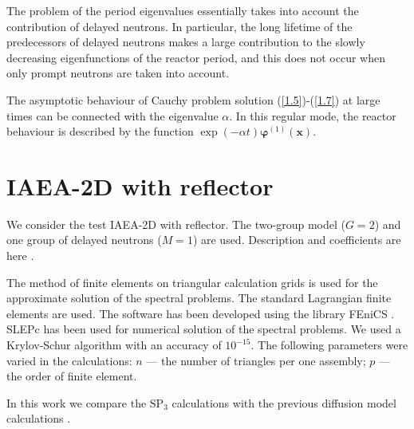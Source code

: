 \documentclass[a4paper]{jpconf}
\begin{document}
The problem of the period eigenvalues essentially takes into account the contribution of delayed neutrons.
In particular, the long lifetime of the predecessors of delayed neutrons makes a large contribution to the slowly decreasing eigenfunctions of the reactor period, and this does not occur when only prompt neutrons are taken into account.

The asymptotic behaviour of Cauchy problem solution (\ref{1.5})-(\ref{1.7}) at large times can be connected with the eigenvalue $\alpha$.
In this regular mode, the reactor behaviour is described by the function $\exp(-\alpha t) \bm \varphi^{(1)}(\bm x)$.

\section{IAEA-2D with reflector}
We consider the test IAEA-2D with reflector.
The two-group model ($G = 2$) and one group of delayed neutrons ($M = 1$) are used. 
Description and coefficients are here \cite{chao1995}.

The method of finite elements \cite{brenner2008} on triangular calculation grids is used for the approximate solution of the spectral problems. 
The standard Lagrangian finite elements are used.
The software has been developed using the library FEniCS \cite{logg2012}.
SLEPc has been used for numerical solution of the spectral problems.
We used a Krylov-Schur algorithm with an accuracy of $10^{-15}$.
The following parameters were varied in the calculations:
$n$ --- the number of triangles per one assembly; 
$p$ --- the order of finite element.

In this work we compare the $\mathrm{SP_3}$ calculations with the previous diffusion model calculations \cite{avvakumov2014, avvakumov2015}.
\end{document}
